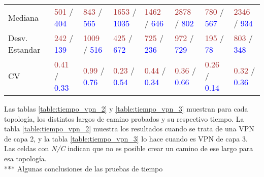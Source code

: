 \begin{table}[ht]
\begin{tabular}{p{2.2cm} p{1.4cm} p{1.4cm} p{1.4cm} p{1.4cm} p{1.4cm} p{1.4cm} p{1.4cm}}
		Mediana & \textcolor{brown}{501} / \textcolor{blue}{404} & \textcolor{brown}{843} / \textcolor{blue}{565} & \textcolor{brown}{1653} / \textcolor{blue}{1035} & \textcolor{brown}{1462} / \textcolor{blue}{646} & \textcolor{brown}{2878} / \textcolor{blue}{802} & \textcolor{brown}{780} / \textcolor{blue}{567} & \textcolor{brown}{2346} / \textcolor{blue}{934} \\
		Desv. Estandar & \textcolor{brown}{242} / \textcolor{blue}{139} & \textcolor{brown}{1009} / \textcolor{blue}{516} & \textcolor{brown}{425} / \textcolor{blue}{672} & \textcolor{brown}{725} / \textcolor{blue}{236} & \textcolor{brown}{972} / \textcolor{blue}{729} & \textcolor{brown}{195} / \textcolor{blue}{78} & \textcolor{brown}{803} / \textcolor{blue}{348} \\
		CV & \textcolor{brown}{0.41} / \textcolor{blue}{0.33} & \textcolor{brown}{0.99} / \textcolor{blue}{0.76} & \textcolor{brown}{0.23} / \textcolor{blue}{0.54} & \textcolor{brown}{0.44} / \textcolor{blue}{0.34} & \textcolor{brown}{0.36} / \textcolor{blue}{0.66} & \textcolor{brown}{0.26} / \textcolor{blue}{0.14} & \textcolor{brown}{0.32} / \textcolor{blue}{0.36} \\ [1ex]
		\hline
	\end{tabular}
	\label{table:tiempo_topo_grande}
\end{table}

Las tablas \ref{table:tiempo_vpn_2} y \ref{table:tiempo_vpn_3} muestran para cada topología, los distintos largos de camino probados y su respectivo tiempo. La tabla \ref{table:tiempo_vpn_2} muestra los resultados cuando se trata de una VPN de capa 2, y la tabla \ref{table:tiempo_vpn_3} lo hace cuando es VPN de capa 3. Las celdas con \textit{N/C} indican que no es posible crear un camino de ese largo para esa topología. \\


*** Algunas conclusiones de las pruebas  de tiempo \\ \\

